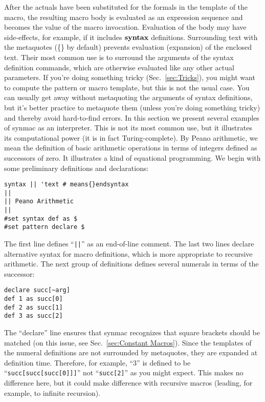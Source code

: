 \documentclass[12pt]{article}
\begin{document}
\label{sec:evaluating-body}
After the actuals have been substituted for the formals in the template of the macro, the resulting macro body is evaluated as an expression sequence and becomes the value of the macro invocation.
Evaluation of the body may have side-effects, for example, if it includes ${\bf syntax}$ definitions.
		Surrounding text with the metaquotes (\{\} by default) prevents evaluation (expansion) of the enclosed text. Their most common use is to surround the arguments of the syntax definition commands, which are otherwise evaluated like any other actual parameters. If you're doing something tricky (Sec.\ \ref{sec:Tricks}), you might want to compute the pattern or macro template, but this is not the usual case. You can usually get away without metaquoting the arguments of syntax definitions, but it's better practice to metaquote them (unless you're doing something tricky) and thereby avoid hard-to-find errors.
In this section we present several examples of synmac as an interpreter.
This is not its most common use, but it illustrates its computational power
(it is in fact Turing-complete).
By Peano arithmetic, we mean the definition of basic arithmetic operations in terms of integers defined as successors of zero.
It illustrates a kind of equational programming.
We begin with some preliminary definitions and declarations:
\begin{lstlisting}[frame=single]
syntax || 'text # means{}endsyntax
||
|| Peano Arithmetic
||
#set syntax def as $
#set pattern declare $
\end{lstlisting}
The first line defines ``\verb+||+'' as an end-of-line comment.
The last two lines declare alternative syntax for macro definitions, which is more appropriate to recursive arithmetic.
%
The next group of definitions defines several numerals in terms of the successor:
\begin{lstlisting}[frame=single,language=func]
declare succ[~arg]
def 1 as succ[0]
def 2 as succ[1]
def 3 as succ[2]
\end{lstlisting}
The ``declare'' line ensures that synmac recognizes that square brackets should be matched (on this issue, see Sec.\ \ref{sec:Constant Macros}).
Since the templates of the numeral definitions are not surrounded by metaquotes, they are expanded at definition time.
Therefore, for example, ``3'' is defined to be ``\lstinline"succ[succ[succ[0]]]"'' not ``\lstinline"succ[2]"'' as you might expect.
This makes no difference here, but it could make difference with recursive macros (leading, for example, to infinite recursion).
\end{document}
